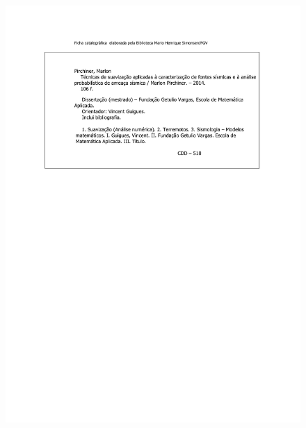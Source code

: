 \documentclass[12pt,twoside,a4paper]{book}
\numberwithin{equation}{section}
\begin{document}
	\begin{figure}[H]
	  \centering
	  \includegraphics[width=\textwidth]{_catalographic} 
	\end{figure}

\pagebreak


\newpage
\thispagestyle{empty}
\end{document}
